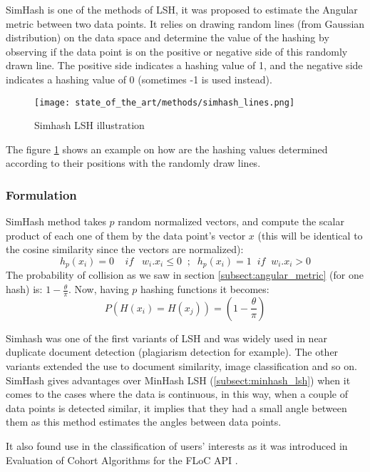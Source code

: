 SimHash is one of the methods of LSH, it was proposed to estimate the Angular
metric between two data points. It relies on drawing random lines (from Gaussian
distribution) on the data space and determine the value of the hashing by
observing if the data point is on the positive or negative side of this randomly
drawn line. The positive side indicates a hashing value of 1, and the negative
side indicates a hashing value of 0 (sometimes -1 is used instead).

\begin{figure}[h]
    \centering
    \texttt{[image: state\_of\_the\_art/methods/simhash\_lines.png]}
    \caption{Simhash LSH illustration}
    \label{fig:simhash_lines}
\end{figure}

The figure \ref{fig:simhash_lines} shows an example on how are the hashing
values determined according to their positions with the randomly draw lines.

\subsubsection{Formulation}
SimHash method takes $p$ random normalized vectors, and compute the scalar
product of each one of them by the data point's vector $x$ (this will be
identical to the cosine similarity since the vectors are normalized):
$$
    h_p(x_i) = 0 \; \; \; \; if \; \; \; w_i . x_i \leq 0 \; \; ; \; \; h_p(x_i) = 1 \; \; if \; \; w_i . x_i > 0
$$
The probability of collision as we saw in section \ref{subsect:angular_metric}
(for one hash) is: $1 -\frac{\theta}{\pi}$. Now, having $p$ hashing
functions it becomes:
$$
    P(H(x_i) = H(x_j) ) = (1 - \frac{\theta}{\pi})
$$

Simhash was one of the first variants of LSH and was widely used in near
duplicate document detection (plagiarism detection for example). The other
variants extended the use to document similarity, image classification and so
on. SimHash gives advantages over MinHash LSH (\ref{subsect:minhash_lsh}) when
it comes to the cases where the data is continuous, in this way, when a couple
of data points is detected similar, it implies that they had a small angle
between them as this method estimates the angles between data points.

It also found use in the classification of users' interests as it was introduced
in Evaluation of Cohort Algorithms for the FLoC API \citep{google_floc_2020}.


